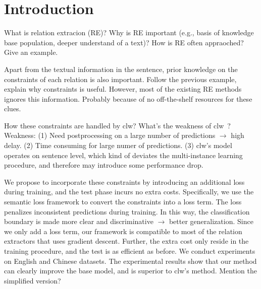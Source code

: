 \section{Introduction}

What is relation extracion (RE)?
Why is RE important (e.g., basis of knowledge base population, deeper understand of a text)?
How is RE often appraoched? Give an example.


Apart from the textual information in the sentence, prior knowledge on the constraints of each relation is also important.
Follow the previous example, explain why constraints is useful.
However, most of the existing RE methods ignores this information.
Probably because of no off-the-shelf resources for these clues.

How these constraints are handled by clw?
What's the weakness of clw~\cite{chen2014encoding}? 
Weakness: 
(1) Need postprocessing on a large number of predictions $\rightarrow$ high delay.
(2) Time consuming for large numer of predictions.
(3) clw's model operates on sentence level, which kind of deviates the multi-instance learning procedure, and therefore may introduce some performance drop.

We propose to incorporate these constraints by introducing an additional loss during training, and the test phase incurs no extra costs.
Specifically, we use the semantic loss framework to convert the constraints into a loss term.
The loss penalizes inconsistent predictions during training.
In this way, the classification boundary is made more clear and discriminative $\rightarrow$ better generalization.
Since we only add a loss term, our framework is compatible to most of the relation extractors that uses gradient descent.
Further, the extra cost only reside in the training procedure, and the test is as efficient as before.
We conduct experiments on English and Chinese datasets.
The experimental results show that our method can clearly improve the base model, and is superior to clw's method.
Mention the simplified version?

